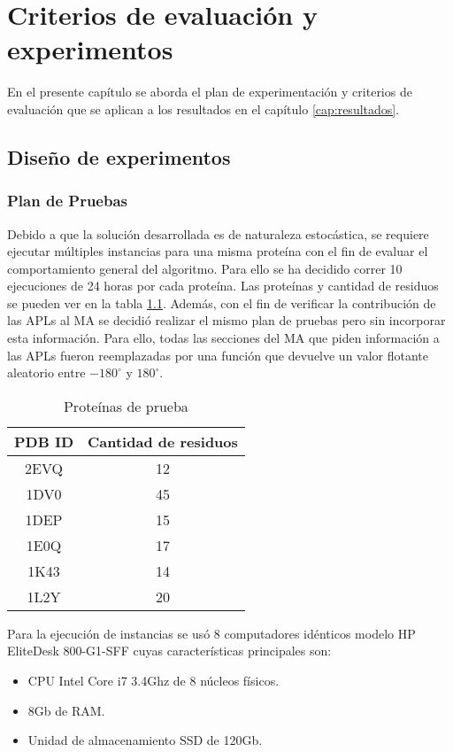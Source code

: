 \chapter{Criterios de evaluación y experimentos}
\label{cap:criterios}

En el presente capítulo se aborda el plan de experimentación y criterios de evaluación que se aplican a los resultados en el capítulo \ref{cap:resultados}.

\section{Diseño de experimentos}

\subsection{Plan de Pruebas}
Debido a que la solución desarrollada es de naturaleza estocástica, se requiere ejecutar múltiples instancias para una misma proteína con el fin de evaluar el comportamiento general del algoritmo. Para ello se ha decidido correr 10 ejecuciones de 24 horas por cada proteína. Las proteínas y cantidad de residuos se pueden ver en la tabla \ref{table:lista-proteinas}. Además, con el fin de verificar la contribución de las APLs al MA se decidió realizar el mismo plan de pruebas pero sin incorporar esta información. Para ello, todas las secciones del MA que piden información a las APLs fueron reemplazadas por una función que devuelve un valor flotante aleatorio entre $-180^\circ$ y $180^\circ$.

\begin{table}[h]
	\centering
	\caption{Proteínas de prueba}
	\begin{tabular}{|c|c|}
		\hline
		\textbf{PDB ID } & \textbf{Cantidad de residuos} \\ \hline
		2EVQ 	& 12		\\		
		1DV0 	& 45		\\ 	
		1DEP 	& 15		\\  
		1E0Q 	& 17		\\ 	
		1K43 	& 14		\\ 
		1L2Y 	& 20		\\		\hline
	\end{tabular}
	\label{table:lista-proteinas}
\end{table}

Para la ejecución de instancias se usó 8 computadores idénticos modelo HP EliteDesk 800-G1-SFF cuyas características principales son:
\begin{itemize}
	\item CPU Intel Core i7 3.4Ghz de 8 núcleos físicos.
	\item 8Gb de RAM.
	\item Unidad de almacenamiento SSD de 120Gb.
\end{itemize}

